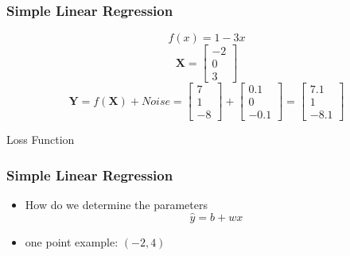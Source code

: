 \documentclass[14 pt]{beamer}
\let\olditem\item
\renewcommand{\item}{\olditem\vspace{4pt}}
\begin{document}
\begin{frame}[fragile]
  \frametitle{Simple Linear Regression}
  \begin{equation*}
    f(x) = 1-3x
  \end{equation*}
  \begin{displaymath}
    \mathbf{X} = 
    \left[ \begin{array}{c}
             -2 \\  0 \\  3 
           \end{array} \right]
         \end{displaymath}
  \begin{displaymath}
    \mathbf{Y} = f(\mathbf{X}) + Noise = 
    \left[ \begin{array}{c}
             7 \\ 1 \\  -8 
           \end{array} \right] + 
         \left[ \begin{array}{c}
                  0.1 \\ 0 \\ -0.1
                \end{array} \right] 
              = \left[ \begin{array}{c}
                         7.1 \\ 1 \\ -8.1
                       \end{array} \right]              \end{displaymath}
\end{frame}

\begin{frame}
\begin{center}
\Large{Loss Function}
\end{center}
\end{frame}

\begin{frame}
  \frametitle{Simple Linear Regression}
  \begin{itemize}
  \item How do we determine the parameters
  \begin{equation*}
    \hat{y} = b + wx
  \end{equation*}
\item one point example: $(-2, 4)$
\end{itemize}
\end{frame}
\end{document}
